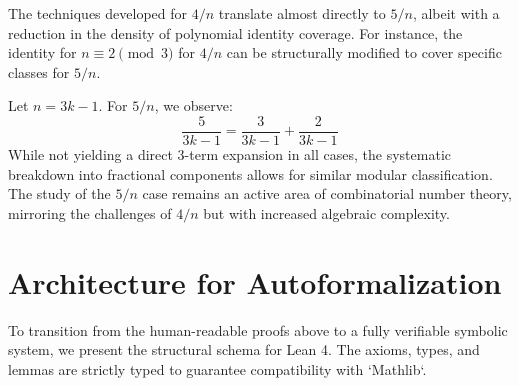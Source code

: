 \documentclass[12pt,a4paper]{article}
\begin{document}
The techniques developed for $4/n$ translate almost directly to $5/n$, albeit with a reduction in the density of polynomial identity coverage. For instance, the identity for $n \equiv 2 \pmod 3$ for $4/n$ can be structurally modified to cover specific classes for $5/n$.

Let $n = 3k - 1$. For $5/n$, we observe:
\begin{equation}
\frac{5}{3k-1} = \frac{3}{3k-1} + \frac{2}{3k-1}
\end{equation}
While not yielding a direct 3-term expansion in all cases, the systematic breakdown into fractional components allows for similar modular classification. The study of the $5/n$ case remains an active area of combinatorial number theory, mirroring the challenges of $4/n$ but with increased algebraic complexity.

\newpage
\section{Architecture for Autoformalization}

To transition from the human-readable proofs above to a fully verifiable symbolic system, we present the structural schema for Lean 4.
The axioms, types, and lemmas are strictly typed to guarantee compatibility with `Mathlib`.
\end{document}
